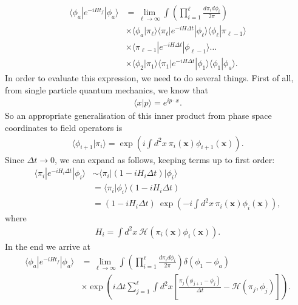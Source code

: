         \begin{align}
            \langle \phi_a| e^{- i H t_f} | \phi_a \rangle &= \lim_{\ell\rightarrow \infty} \int \left( \prod_{i=1}^{\ell} \frac{d\pi_i d\phi_i}{2\pi} \right) \nonumber \\
            &\times \langle \phi_a | \pi_{\ell} \rangle \langle \pi_{\ell}|  e^{-i H \Delta t}| \phi_{\ell} \rangle \langle \phi_{\ell} | \pi_{\ell-1} \rangle \nonumber \\
            &\times \langle \pi_{\ell-1} | e^{-i H \Delta t} | \phi_{\ell-1} \rangle \dots \nonumber \\
            &\times \langle \phi_2 | \pi_1 \rangle \langle \pi_1 | e^{-i H \Delta t} | \phi_1 \rangle \langle \phi_1 |\phi_a \rangle.
        \end{align}
        In order to evaluate this expression, we need to do several things. First of all, from single particle quantum mechanics, we know that 
        \begin{align}
            \langle x | p \rangle = e^{i p \cdot x}.
        \end{align}
        So an appropriate generalisation of this inner product from phase space coordinates to field operators is 
        \begin{align}
            \langle \phi_{i+1}| \pi_i \rangle = \exp \left(i \int d^2 x \ \pi_i(\bm{x}) \phi_{i+1}(\bm{x}) \right).
        \end{align}
        Since $\Delta t \rightarrow 0$, we can expand as follows, keeping terms up to first order:
        \begin{align}
            \langle \pi_i | e^{-i H_i \Delta t} | \phi_i \rangle &\sim \langle \pi_i | (1- i H_i \Delta t ) | \phi_i \rangle \nonumber \\
            &= \langle \pi_i | \phi_i \rangle (1 - i H_i \Delta t) \nonumber \\
            & = (1-i H_i \Delta t) \ \exp\left(-i \int d^2x \, \pi_i(\bm{x}) \phi_i (\bm{x})  \right),
        \end{align}
        where
        \begin{align}
            H_i = \int d^2 x \ \mathcal{H}\left(\pi_i (\bm{x}) \phi_i (\bm{x}) \right).
        \end{align}
        In the end we arrive at 
        \begin{align}
            \langle \phi_a | e^{-i H t_f} | \phi_a \rangle &= \lim_{\ell\rightarrow \infty} \int \left( \prod_{i=1}^{\ell} \frac{d \pi_i d\phi_i}{2\pi} \right) \delta \left(\phi_1 -\phi_a \right) \nonumber \\
            &\times \exp \left(i \Delta t \sum_{j=1}^{\ell} \int d^2x \left[\frac{\pi_j (\phi_{j+1} -\phi_j)}{\Delta t} - \mathcal{H}(\pi_j, \phi_j) \right] \right).
        \end{align}
